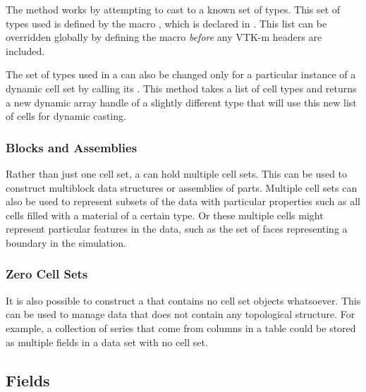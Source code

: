 The  method works by attempting to cast to a known
set of types. This set of types used is defined by the macro
, which is declared in
. This list can be overridden
globally by defining the 
macro \emph{before} any VTK-m headers are included.

The set of types used in a  can also be changed only
for a particular instance of a dynamic cell set by calling its
. This method takes a list of cell types and
returns a new dynamic array handle of a slightly different type that will
use this new list of cells for dynamic casting.


\subsubsection{Blocks and Assemblies}

Rather than just one cell set, a  can hold multiple cell
sets. This can be used to construct multiblock data structures or
assemblies of parts. Multiple cell sets can also be used to represent
subsets of the data with particular properties such as all cells filled
with a material of a certain type. Or these multiple cells might represent
particular features in the data, such as the set of faces representing a
boundary in the simulation.

\subsubsection{Zero Cell Sets}

It is also possible to construct a  that contains no cell
set objects whatsoever. This can be used to manage data that does not
contain any topological structure. For example, a collection of series that
come from columns in a table could be stored as multiple fields in a data
set with no cell set.


\subsection{Fields}
\label{sec:DataSets:Fields}


